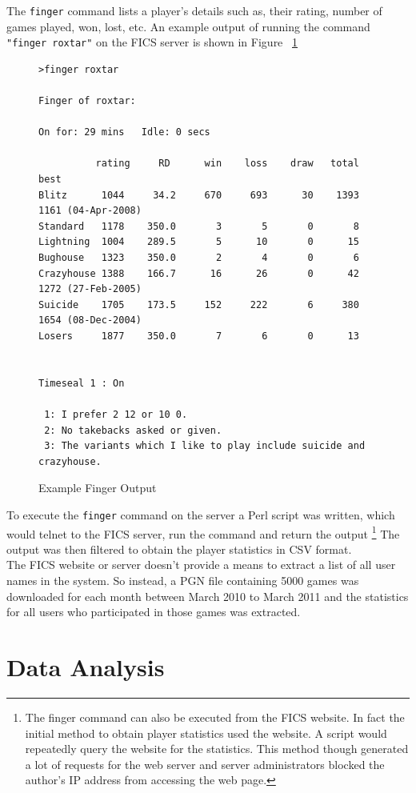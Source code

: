 \documentclass{article}
\begin{document}
The \verb=finger= command lists a player's details such as, their rating, number of games played, won, lost, etc. An example output of running the command \verb="finger roxtar"= on the FICS server is shown in Figure ~\ref{fig:finger}

\begin{figure}[htp]
\begin{verbatim}
>finger roxtar

Finger of roxtar:

On for: 29 mins   Idle: 0 secs

          rating     RD      win    loss    draw   total   best
Blitz      1044     34.2     670     693      30    1393   1161 (04-Apr-2008)
Standard   1178    350.0       3       5       0       8
Lightning  1004    289.5       5      10       0      15
Bughouse   1323    350.0       2       4       0       6
Crazyhouse 1388    166.7      16      26       0      42   1272 (27-Feb-2005)
Suicide    1705    173.5     152     222       6     380   1654 (08-Dec-2004)
Losers     1877    350.0       7       6       0      13


Timeseal 1 : On

 1: I prefer 2 12 or 10 0.
 2: No takebacks asked or given.
 3: The variants which I like to play include suicide and crazyhouse.
\end{verbatim}
\caption{Example Finger Output}
\label{fig:finger}
\end{figure}

\pagebreak

To execute the \verb=finger= command on the server a Perl script was written, which would telnet to the FICS server, run the command and return the output \footnote{The finger command can also be executed from the FICS website. In fact the initial method to obtain player statistics used the website. A script would repeatedly query the website for the statistics. This method though generated a lot of requests for the web server and server administrators blocked the author's IP address from accessing the web page.}  The output was then filtered to obtain the player statistics in CSV format. \\

The FICS website or server doesn't provide a means to extract a list of all user names in the system. So instead, a PGN file containing 5000 games was downloaded for each month between March 2010 to March 2011 and the statistics for all users who participated in those games was extracted. 

\section{Data Analysis}
\end{document}
